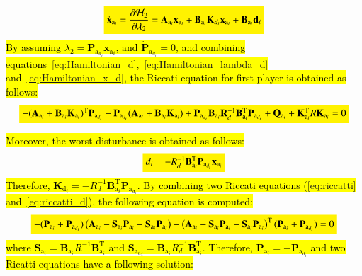 \documentclass[3p]{elsarticle}
\begin{document}
\begin{equation}\label{eq:Hamiltonian_x_d}
    \colorbox{yellow}{$\dot{\mathbf{x}}_{\mathrm{a}_i}  = \dfrac{\partial \mathcal{H}_2}{\partial \lambda_2} = \mathbf{A}_{\mathrm{a}_i} \mathbf{x}_{\mathrm{a}_i}  +  \mathbf{B}_{\mathrm{a}_i} \mathbf{K}_{d_i} \mathbf{x}_{\mathrm{a}_i} + \mathbf{B}_{\mathrm{a}_i} \mathbf{d}_i$}
\end{equation}
\hl{By assuming $\lambda_2 = \mathbf{P}_{\mathrm{a}_{d_i}}\mathbf{x}_{\mathrm{a}_i}$, 
 and $\dot{\mathbf{P}}_{\mathrm{a}_{d_i}} = 0$, and combining equations~{\eqref{eq:Hamiltonian_d}},~{\eqref{eq:Hamiltonian_lambda_d}} and~{\eqref{eq:Hamiltonian_x_d}}, the Riccati equation for first player is obtained as follows:}
 \begin{equation}\label{eq:riccatti_d}
    \colorbox{yellow}{$-( \mathbf{A}_{\mathrm{a}_i} + \mathbf{B}_{\mathrm{a}_i}\mathbf{K}_{\mathrm{a}_i})^\mathrm{T} \mathbf{P}_{\mathrm{a}_{d_i}} - \mathbf{P}_{\mathrm{a}_{d_i}} (\mathbf{A}_{\mathrm{a}_i} + \mathbf{B}_{\mathrm{a}_i}\mathbf{K}_{\mathrm{a}_i}) + \mathbf{P}_{\mathrm{a}_{d_i}} \mathbf{B}_{\mathrm{a}_i} \mathbf{R}_d^{-1} \mathbf{B}_{\mathrm{a}_i}^\mathrm{T} \mathbf{P}_{\mathrm{a}_{d_i}} + \mathbf{Q}_{\mathrm{a}_i}  + \mathbf{K}_{\mathrm{a}_i}^\mathrm{T} R \mathbf{K}_{\mathrm{a}_i} = 0$}
\end{equation}

\hl{ Moreover, the worst disturbance is obtained as follows:}
\begin{equation}
    \colorbox{yellow}{$d_i = -R_d^{-1}\mathbf{B}_{\mathrm{a}_i}^\mathrm{T}\mathbf{P}_{\mathrm{a}_{d_i}}\mathbf{x}_{\mathrm{a}_i}$}
\end{equation}
    \hl{Therefore, $\mathbf{K}_{\mathrm{d}_i} = -R_d^{-1}\mathbf{B}_{\mathrm{a}_i}^\mathrm{T}\mathbf{P}_{\mathrm{a}_{d_i}}$.
     By combining two Riccati equations ({\eqref{eq:riccatti}} and~{\eqref{eq:riccatti_d}}), the following equation is computed:}
     \begin{equation}
        \colorbox{yellow}{$-(\mathbf{P}_{\mathrm{a}_{i}} + \mathbf{P}_{\mathrm{a}_{d_i}})\left(
        \mathbf{A}_{\mathrm{a}_i} - \mathbf{S}_{\mathrm{a}_i}\mathbf{P}_{\mathrm{a}_{i}} - \mathbf{S}_{\mathrm{a}_i} \mathbf{P}_{\mathrm{a}_i}
        \right) - \left(
        \mathbf{A}_{\mathrm{a}_i}  - \mathbf{S}_{\mathrm{a}_i}\mathbf{P}_{\mathrm{a}_{i}} - \mathbf{S}_{\mathrm{a}_i} \mathbf{P}_{\mathrm{a}_i}
        \right)^\mathrm{T}(\mathbf{P}_{\mathrm{a}_{i}} + \mathbf{P}_{\mathrm{a}_{d_i}})=0$}
    \end{equation}
    \hl{where $\mathbf{S}_{\mathrm{a}_i} = \mathbf{B}_{\mathrm{a}_i}{R}^{-1}\mathbf{B}_{\mathrm{a}_i}^\mathrm{T}$ and $\mathbf{S}_{\mathrm{a_d}_i} = \mathbf{B}_{\mathrm{a}_i}{R}_d^{-1}\mathbf{B}_{\mathrm{a}_i}^\mathrm{T}$. Therefore, $\mathbf{P}_{\mathrm{a}_i} = -\mathbf{P}_{\mathrm{a}_{d_i}}$ and two Ricatti equations have a following solution:}
\end{document}
